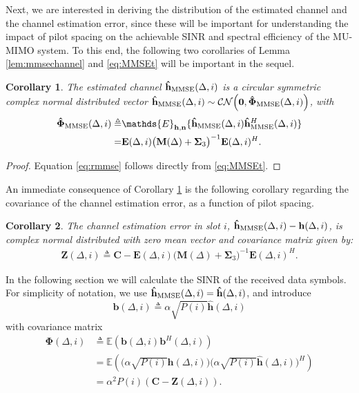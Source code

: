 \documentclass[conference, a4paper, 10pt]{IEEEtran}
\newcommand{\dg}[1]{\textcolor{magenta}{{#1}}}
\newtheorem{cor}{Corollary}
\newcommand{\mx}[1]{\mathbf{#1}}
\newcommand{\bs}[1]{\boldsymbol{#1}}
\begin{document}
Next, we are interested in deriving the distribution of the estimated channel and
the channel estimation error, since these will be important for understanding the
impact of pilot spacing on the achievable \ac{SINR} and spectral efficiency of
the \ac{MU-MIMO} system. To this end, the following two corollaries of
Lemma \ref{lem:mmsechannel} and \eqref{eq:MMSEt} will be important in the sequel.
\begin{cor}
\label{cor:rmmse}	
The estimated channel $\mathbf{\hat h}_{\textup{MMSE}}(\Delta, i)$ is a circular symmetric complex normal distributed vector
$\mathbf{\hat h}_{\textup{MMSE}}(\Delta, i) \sim %
\mathcal{CN}\Big(\mathbf{0},\mathbf{\hat \Phi}_{\textup{MMSE}}(\Delta, i)\Big)$,
with
\begin{align}
\label{eq:rmmse}
\mathbf{\hat \Phi}_{\textup{MMSE}}(\Delta, i) \triangleq
& \mathds{E}_{\mathbf{h},\mathbf{n}} \{\mathbf{\hat h}_{\textup{MMSE}}(\Delta, i) \mathbf{\hat h}_{\textup{MMSE}}^H(\Delta, i)\}
 \nonumber \\
=& \mx{E}(\Delta, i) \big(\mx{M}(\Delta)+\mx{\Sigma}_3\big)^{-1} \mx{E}(\Delta, i)^H.
\end{align}

\end{cor}

\begin{proof}
Equation \eqref{eq:rmmse} follows directly from \eqref{eq:MMSEt}.	
\end{proof}

An immediate consequence of Corollary \ref{cor:rmmse}
is the following corollary regarding the covariance of the channel estimation
error, as a function of pilot spacing.
\begin{cor}
\label{Cor:ChEstError}
The channel estimation error in slot $i$, $\mx{\hat{h}}_{\textup{MMSE}}(\Delta, i)-\mx{h}(\Delta, i)$,
is complex normal distributed with zero mean vector and
covariance matrix given by:
\begin{align}
\label{eq:Z}
\mx{Z}(\Delta, i) \triangleq  \mx{C} -
\mx{E}(\Delta, i) \big(\mx{M}(\Delta)+\mx{\Sigma}_3\big)^{-1}
\mx{E}(\Delta, i)^H.
\end{align}
\end{cor}

In the following section we will calculate the \ac{SINR} of the received data symbols.
For simplicity of notation, we use $\mx{\hat h}_{\textup{MMSE}}(\Delta, i)=\mx{\hat h}(\Delta, i)$, and  introduce
$$\mx{b}(\Delta, i) \triangleq \alpha\sqrt{P(i)}\mx{\hat{h}}(\Delta, i)$$
with covariance matrix
\begin{align}
\label{eq:Phi}
\bs{\Phi}(\Delta, i) & \triangleq
\mathds{E}\left( \mx{b}(\Delta, i)\mx{b}^H(\Delta, i) \right)  \nonumber \\
&=\mathds{E}\left( \Big(\alpha\sqrt{P(i)} \mx{\hat{h}}(\Delta, i) \Big)\Big(\alpha\sqrt{P(i)} \mx{\hat{h}}(\Delta, i) \Big)^H  \right)  \nonumber \\
&=\alpha^2P(i)(\mx{C}-\mx{Z}(\Delta, i)).
\end{align}
\end{document}
